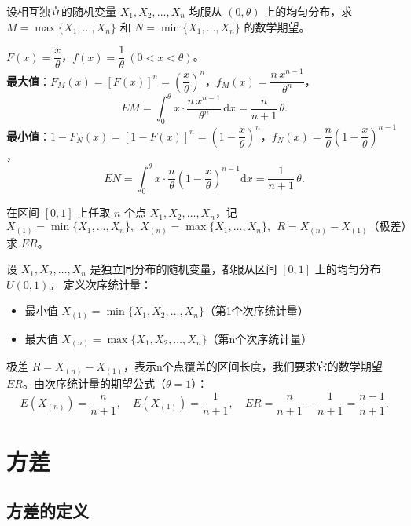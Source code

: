 \documentclass[lang=cn,11pt]{elegantbook}
\begin{document}
\begin{exercise}\label{exer:4-order-stat}
设相互独立的随机变量 \(X_1, X_2, \dots, X_n\) 均服从 \((0, \theta)\) 上的均匀分布，求 \(M = \max\{X_1, \dots, X_n\}\) 和 \(N = \min\{X_1, \dots, X_n\}\) 的数学期望。
\end{exercise}
\begin{solution}
\(F(x) = \dfrac{x}{\theta}\)，\(f(x) = \dfrac{1}{\theta}\ (0 < x < \theta)\)。\\
\textbf{最大值}：\(F_M(x) = [F(x)]^n = \left(\dfrac{x}{\theta}\right)^n\)，\(f_M(x) = \dfrac{n\,x^{n-1}}{\theta^n}\)，
\[
EM = \int_0^\theta x \cdot \frac{n\,x^{n-1}}{\theta^n}\,\mathrm{d}x = \frac{n}{n+1}\,\theta.
\]
\textbf{最小值}：\(1 - F_N(x) = [1 - F(x)]^n = \left(1 - \dfrac{x}{\theta}\right)^n\)，\(f_N(x) = \dfrac{n}{\theta}\!\left(1 - \dfrac{x}{\theta}\right)^{n-1}\)，
\[
EN = \int_0^\theta x \cdot \frac{n}{\theta}\!\left(1 - \frac{x}{\theta}\right)^{n-1}\mathrm{d}x = \frac{1}{n+1}\,\theta.
\]
\end{solution}



\begin{exercise}\label{exer:4-range}
在区间 \([0,1]\) 上任取 \(n\) 个点 \(X_1, X_2, \dots, X_n\)，记 \[X_{(1)} = \min\{X_1, \dots, X_n\},~~X_{(n)} = \max\{X_1, \dots, X_n\},~~R = X_{(n)} - X_{(1)}\text{（极差）}\]求 \(ER\)。
\end{exercise}
\begin{solution}
设 \( X_1,X_2,\dots,X_n \) 是独立同分布的随机变量，都服从区间 \([0,1]\) 上的均匀分布 \( U(0,1) \)。 定义次序统计量：
\begin{itemize}
    \item 最小值 \( X_{(1)} = \min\{X_1,X_2,\dots,X_n\} \)（第1个次序统计量）
    \item 最大值 \( X_{(n)} = \max\{X_1,X_2,\dots,X_n\} \)（第n个次序统计量）
\end{itemize}
极差 \( R = X_{(n)} - X_{(1)} \)，表示n个点覆盖的区间长度，我们要求它的数学期望 \( ER \)。由次序统计量的期望公式（\(\theta = 1\)）：
\[
E(X_{(n)}) = \frac{n}{n+1},\quad E(X_{(1)}) = \frac{1}{n+1},\quad ER = \frac{n}{n+1} - \frac{1}{n+1} = \frac{n-1}{n+1}.
\]
\end{solution}


\section{方差}

\subsection{方差的定义}
\end{document}
